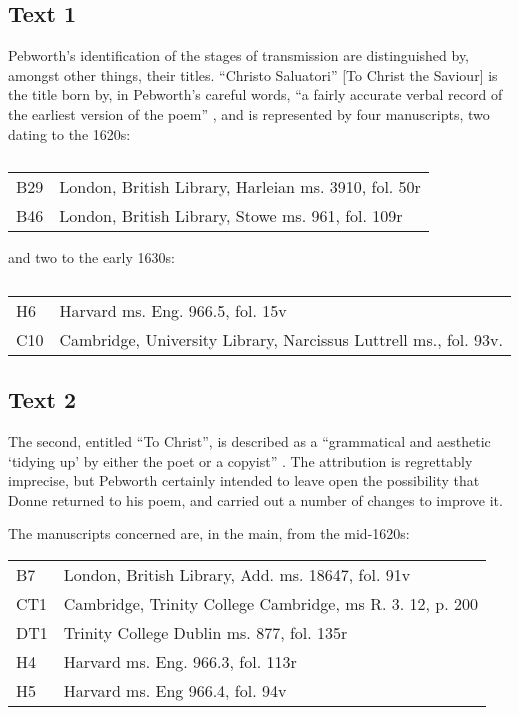 \begin{paper}
\subsection{Text 1}

Pebworth's identification of the stages of transmission are
distinguished by, amongst other things, their titles. ``Christo
Saluatori'' {[}To Christ the Saviour{]} is the title born by, in
Pebworth's careful words, ``a fairly accurate verbal record of the
earliest version of the poem'' \citeyearpar[23]{pebworth_editor_1987}, and is represented by four
manuscripts, two dating to the 1620s:


\begin{table}[H]
    \centering\small
    \begin{tabular}{lp{}}
         B29 & London, British Library, Harleian ms. 3910, fol. 50r \\
         B46 & London, British Library, Stowe ms. 961, fol. 109r
    \end{tabular}
    \caption*{}
\end{table}

\noindent and two to the early 1630s:

\begin{table}[H]
    \centering\small
    \begin{tabular}{lp{}}
    H6 & Harvard ms. Eng. 966.5, fol. 15v \\
    C10 & Cambridge, University Library, Narcissus Luttrell ms., fol. 93v.
    \end{tabular}
    \caption*{}
\end{table}

\vfill

\subsection{Text 2}
The second, entitled ``To Christ'', is described as a ``grammatical and
aesthetic `tidying up' by either the poet or a copyist'' \citeyearpar[21 and 23]{pebworth_editor_1987}. The attribution is regrettably imprecise, but Pebworth certainly
intended to leave open the possibility that Donne returned to his poem,
and carried out a number of changes to improve it.

The manuscripts concerned are, in the main, from the mid-1620s:

\begin{table}[H]
    \centering\small
    \begin{tabular}{lp{}}
    B7 & London, British Library, Add. ms. 18647, fol. 91v \\
    CT1 & Cambridge, Trinity College Cambridge, ms R. 3. 12, p. 200 \\
    DT1 & Trinity College Dublin ms. 877, fol. 135r \\
    H4 & Harvard ms. Eng. 966.3, fol. 113r \\
    H5 & Harvard ms. Eng 966.4, fol. 94v
    \end{tabular}
\end{table}


\end{paper}
